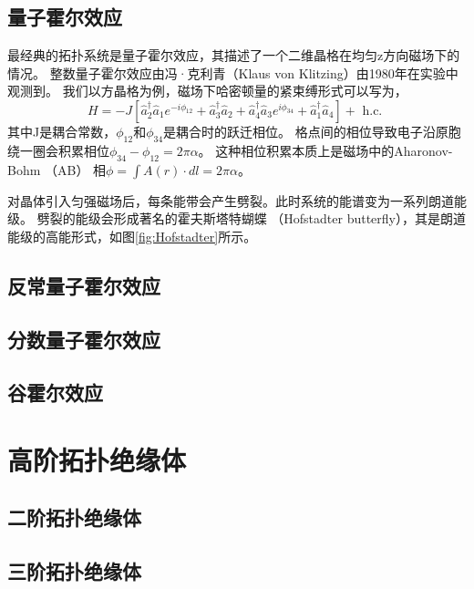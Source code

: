\subsection{量子霍尔效应}
最经典的拓扑系统是量子霍尔效应，其描述了一个二维晶格在均匀z方向磁场下的情况。
整数量子霍尔效应由冯·克利青（Klaus von Klitzing）由1980年在实验中观测到\cite{klitzing1980new}。
我们以方晶格为例，磁场下哈密顿量的紧束缚形式可以写为，
\begin{equation}
	H=-J\left[\hat{a}_2^{\dagger} \hat{a}_1 e^{-i \phi_{12}}+\hat{a}_3^{\dagger} \hat{a}_2+\hat{a}_4^{\dagger} \hat{a}_3 e^{i \phi_{34}}+\hat{a}_1^{\dagger} \hat{a}_4\right]+\text { h.c. }
\end{equation}
其中J是耦合常数，$\phi_{12}$和$\phi_{34}$是耦合时的跃迁相位。
格点间的相位导致电子沿原胞绕一圈会积累相位$\phi_{34}-\phi_{12}=2\pi\alpha$。
这种相位积累本质上是磁场中的Aharonov-Bohm （AB） 相$\phi=\int A(r) \cdot dl=2\pi\alpha$。

对晶体引入匀强磁场后，每条能带会产生劈裂。此时系统的能谱变为一系列朗道能级。
劈裂的能级会形成著名的霍夫斯塔特蝴蝶 （Hofstadter butterfly），其是朗道能级的高能形式，如图\ref{fig:Hofstadter}所示。
\subsection{反常量子霍尔效应}
\subsection{分数量子霍尔效应}
\subsection{谷霍尔效应}
\section{高阶拓扑绝缘体}
\subsection{二阶拓扑绝缘体}
\subsection{三阶拓扑绝缘体}